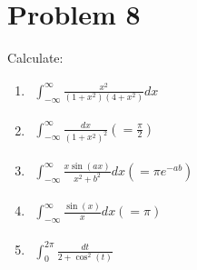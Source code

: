 \documentclass[11pt]{article}
\begin{document}
\section{Problem 8}
Calculate:
\begin{enumerate}[label=\textbf{(\alph*)}]
    \item
          \begin{flushleft}
              $\begin{aligned}
                      \int_{-\infty}^{\infty}\frac{x^{2}}{(1+x^{2})(4+x^{2})}dx
                  \end{aligned}$
          \end{flushleft}
    \item
          \begin{flushleft}
              $\begin{aligned}
                      \int_{-\infty}^{\infty}\frac{dx}{(1+x^{2})^{2}}(=\frac{\pi}{2})
                  \end{aligned}$
          \end{flushleft}
    \item
          \begin{flushleft}
              $\begin{aligned}
                      \int_{-\infty}^{\infty}\frac{x\sin(ax)}{x^{2}+b^{2}}dx(=\pi e^{-ab})
                  \end{aligned}$
          \end{flushleft}
    \item
          \begin{flushleft}
              $\begin{aligned}
                      \int_{-\infty}^{\infty}\frac{\sin(x)}{x}dx(=\pi)
                  \end{aligned}$
          \end{flushleft}
    \item
          \begin{flushleft}
              $\begin{aligned}
                      \int_{0}^{2\pi}\frac{dt}{2+\cos^{2}(t)}
                  \end{aligned}$
          \end{flushleft}
\end{enumerate}
\end{document}
